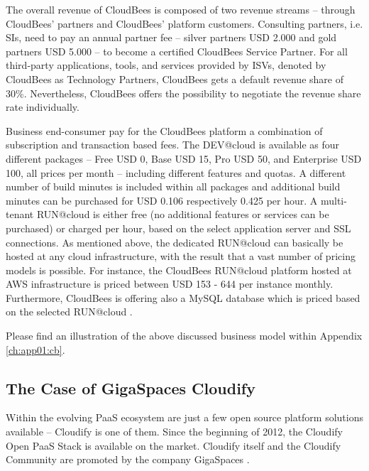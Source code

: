 The overall revenue of CloudBees is composed of two revenue streams -- through CloudBees' partners and CloudBees' platform customers. Consulting partners, i.e. \acp{SI}, need to pay an annual partner fee -- silver partners USD 2.000 and gold partners USD 5.000 -- to become a certified \linebreak CloudBees Service Partner. For all third-party applications, tools, and services provided by \acp{ISV}, denoted by CloudBees as Technology Partners, CloudBees gets a default revenue share of 30\%. Nevertheless, CloudBees offers the possibility to negotiate the revenue share rate individually.

Business end-consumer pay for the CloudBees platform a combination of subscription and transaction based fees. The DEV@cloud is available as four different packages -- Free USD 0, Base USD 15, Pro USD 50, and Enterprise USD 100, all prices per month -- including different features and quotas. A different number of build minutes is included within all packages and additional build minutes can be purchased for USD 0.106 respectively 0.425 per hour. A multi-tenant RUN@cloud is either free (no additional features or services can be purchased) or charged per hour, based on the select application server and SSL connections. As mentioned above, the dedicated RUN@cloud can basically be hosted at any cloud infrastructure, with the result that a vast number of pricing models is possible. For instance, the CloudBees RUN@cloud platform hosted at \ac{AWS} infrastructure is priced between USD 153 - 644 per instance monthly. Furthermore, CloudBees is offering also a MySQL database which is priced based on the selected RUN@cloud \citep{CloudBees2013}.

Please find an illustration of the above discussed business model within Appendix \ref{ch:app01:cb}.

%

\subsection{The Case of GigaSpaces Cloudify}\label{ch:sota:gsc}

Within the evolving \ac{PaaS} ecosystem are just a few open source platform solutions available -- Cloudify is one of them. Since the beginning of 2012, the Cloudify Open \ac{PaaS} Stack is available on the market. Cloudify itself and the Cloudify Community are promoted by the company GigaSpaces \citep{GigaSpaces2013a}.

